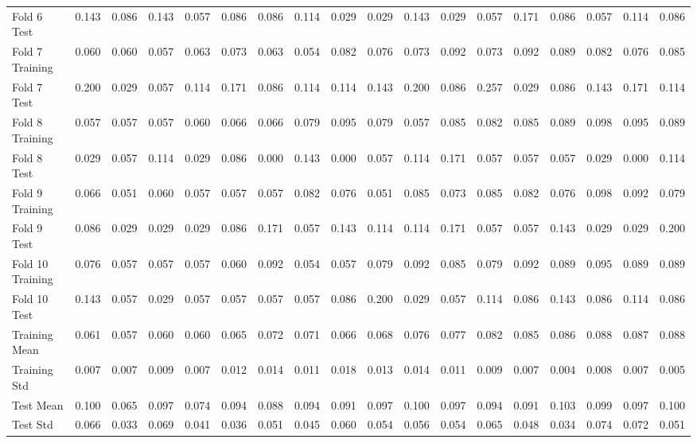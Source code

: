 \documentclass[12pt,oneside,a4paper]{article}
\begin{document}
\begin{landscape}
\begin{table}[ht]
\begin{tabular}{lrrrrrrrrrrrrrrrrr}
  Fold 6 Test & 0.143 & 0.086 & 0.143 & 0.057 & 0.086 & 0.086 & 0.114 & 0.029 & 0.029 & 0.143 & 0.029 & 0.057 & 0.171 & 0.086 & 0.057 & 0.114 & 0.086 \\
  Fold 7 Training & 0.060 & 0.060 & 0.057 & 0.063 & 0.073 & 0.063 & 0.054 & 0.082 & 0.076 & 0.073 & 0.092 & 0.073 & 0.092 & 0.089 & 0.082 & 0.076 & 0.085 \\
  Fold 7 Test & 0.200 & 0.029 & 0.057 & 0.114 & 0.171 & 0.086 & 0.114 & 0.114 & 0.143 & 0.200 & 0.086 & 0.257 & 0.029 & 0.086 & 0.143 & 0.171 & 0.114 \\
  Fold 8 Training & 0.057 & 0.057 & 0.057 & 0.060 & 0.066 & 0.066 & 0.079 & 0.095 & 0.079 & 0.057 & 0.085 & 0.082 & 0.085 & 0.089 & 0.098 & 0.095 & 0.089 \\
  Fold 8 Test & 0.029 & 0.057 & 0.114 & 0.029 & 0.086 & 0.000 & 0.143 & 0.000 & 0.057 & 0.114 & 0.171 & 0.057 & 0.057 & 0.057 & 0.029 & 0.000 & 0.114 \\
  Fold 9 Training & 0.066 & 0.051 & 0.060 & 0.057 & 0.057 & 0.057 & 0.082 & 0.076 & 0.051 & 0.085 & 0.073 & 0.085 & 0.082 & 0.076 & 0.098 & 0.092 & 0.079 \\
  Fold 9 Test & 0.086 & 0.029 & 0.029 & 0.029 & 0.086 & 0.171 & 0.057 & 0.143 & 0.114 & 0.114 & 0.171 & 0.057 & 0.057 & 0.143 & 0.029 & 0.029 & 0.200 \\
  Fold 10 Training & 0.076 & 0.057 & 0.057 & 0.057 & 0.060 & 0.092 & 0.054 & 0.057 & 0.079 & 0.092 & 0.085 & 0.079 & 0.092 & 0.089 & 0.095 & 0.089 & 0.089 \\
  Fold 10 Test & 0.143 & 0.057 & 0.029 & 0.057 & 0.057 & 0.057 & 0.057 & 0.086 & 0.200 & 0.029 & 0.057 & 0.114 & 0.086 & 0.143 & 0.086 & 0.114 & 0.086 \\
  Training Mean & 0.061 & 0.057 & 0.060 & 0.060 & 0.065 & 0.072 & 0.071 & 0.066 & 0.068 & 0.076 & 0.077 & 0.082 & 0.085 & 0.086 & 0.088 & 0.087 & 0.088 \\
  Training Std & 0.007 & 0.007 & 0.009 & 0.007 & 0.012 & 0.014 & 0.011 & 0.018 & 0.013 & 0.014 & 0.011 & 0.009 & 0.007 & 0.004 & 0.008 & 0.007 & 0.005 \\
  Test Mean & 0.100 & 0.065 & 0.097 & 0.074 & 0.094 & 0.088 & 0.094 & 0.091 & 0.097 & 0.100 & 0.097 & 0.094 & 0.091 & 0.103 & 0.099 & 0.097 & 0.100 \\
  Test Std & 0.066 & 0.033 & 0.069 & 0.041 & 0.036 & 0.051 & 0.045 & 0.060 & 0.054 & 0.056 & 0.054 & 0.065 & 0.048 & 0.034 & 0.074 & 0.072 & 0.051 \\
   \bottomrule
\end{tabular}
\label{tab:rf2}
\end{table}
\end{landscape}
\end{document}
